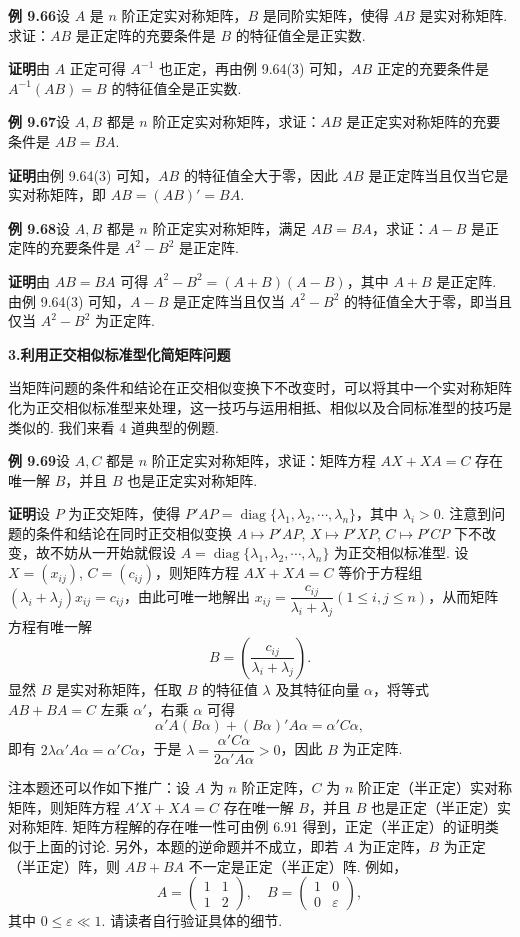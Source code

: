 \documentclass[UTF8,12pt,a4paper,fontset=fandol]{ctexart}
\begin{document}
\noindent\textbf{例 9.66}\quad 设 $A$ 是 $n$ 阶正定实对称矩阵，$B$ 是同阶实矩阵，使得 $AB$ 是实对称矩阵. 求证：$AB$ 是正定阵的充要条件是 $B$ 的特征值全是正实数.

\noindent\textbf{证明}\quad 由 $A$ 正定可得 $A^{-1}$ 也正定，再由例 9.64(3) 可知，$AB$ 正定的充要条件是 $A^{-1}(AB)=B$ 的特征值全是正实数.

\noindent\textbf{例 9.67}\quad 设 $A,B$ 都是 $n$ 阶正定实对称矩阵，求证：$AB$ 是正定实对称矩阵的充要条件是 $AB=BA$.

\noindent\textbf{证明}\quad 由例 9.64(3) 可知，$AB$ 的特征值全大于零，因此 $AB$ 是正定阵当且仅当它是实对称矩阵，即 $AB=(AB)'=BA$.

\noindent\textbf{例 9.68}\quad 设 $A,B$ 都是 $n$ 阶正定实对称矩阵，满足 $AB=BA$，求证：$A-B$ 是正定阵的充要条件是 $A^2-B^2$ 是正定阵.

\noindent\textbf{证明}\quad 由 $AB=BA$ 可得 $A^2-B^2=(A+B)(A-B)$，其中 $A+B$ 是正定阵. 由例 9.64(3) 可知，$A-B$ 是正定阵当且仅当 $A^2-B^2$ 的特征值全大于零，即当且仅当 $A^2-B^2$ 为正定阵.

\noindent\textbf{3.\quad 利用正交相似标准型化简矩阵问题}

当矩阵问题的条件和结论在正交相似变换下不改变时，可以将其中一个实对称矩阵化为正交相似标准型来处理，这一技巧与运用相抵、相似以及合同标准型的技巧是类似的. 我们来看 4 道典型的例题.

\noindent\textbf{例 9.69}\quad 设 $A,C$ 都是 $n$ 阶正定实对称矩阵，求证：矩阵方程 $AX+XA=C$ 存在唯一解 $B$，并且 $B$ 也是正定实对称矩阵.

\noindent\textbf{证明}\quad 设 $P$ 为正交矩阵，使得 $P'AP=\operatorname{diag}\{\lambda_1,\lambda_2,\cdots,\lambda_n\}$，其中 $\lambda_i>0$. 注意到问题的条件和结论在同时正交相似变换 $A\mapsto P'AP$, $X\mapsto P'XP$, $C\mapsto P'CP$ 下不改变，故不妨从一开始就假设 $A=\operatorname{diag}\{\lambda_1,\lambda_2,\cdots,\lambda_n\}$ 为正交相似标准型. 设 $X=(x_{ij})$, $C=(c_{ij})$，则矩阵方程 $AX+XA=C$ 等价于方程组 $(\lambda_i+\lambda_j)x_{ij}=c_{ij}$，由此可唯一地解出 $x_{ij}=\dfrac{c_{ij}}{\lambda_i+\lambda_j}(1\le i,j\le n)$，从而矩阵方程有唯一解
\[
B=\left(\frac{c_{ij}}{\lambda_i+\lambda_j}\right).
\]
显然 $B$ 是实对称矩阵，任取 $B$ 的特征值 $\lambda$ 及其特征向量 $\alpha$，将等式 $AB+BA=C$ 左乘 $\alpha'$，右乘 $\alpha$ 可得
\[
\alpha'A(B\alpha)+(B\alpha)'A\alpha=\alpha'C\alpha,
\]
即有 $2\lambda\alpha'A\alpha=\alpha'C\alpha$，于是 $\lambda=\dfrac{\alpha'C\alpha}{2\alpha'A\alpha}>0$，因此 $B$ 为正定阵.

注\quad 本题还可以作如下推广：设 $A$ 为 $n$ 阶正定阵，$C$ 为 $n$ 阶正定（半正定）实对称矩阵，则矩阵方程 $A'X+XA=C$ 存在唯一解 $B$，并且 $B$ 也是正定（半正定）实对称矩阵. 矩阵方程解的存在唯一性可由例 6.91 得到，正定（半正定）的证明类似于上面的讨论. 另外，本题的逆命题并不成立，即若 $A$ 为正定阵，$B$ 为正定（半正定）阵，则 $AB+BA$ 不一定是正定（半正定）阵. 例如，
\[
A=\begin{pmatrix}1&1\\1&2\end{pmatrix},\quad
B=\begin{pmatrix}1&0\\0&\varepsilon\end{pmatrix},
\]
其中 $0\le\varepsilon\ll1$. 请读者自行验证具体的细节.
\end{document}
